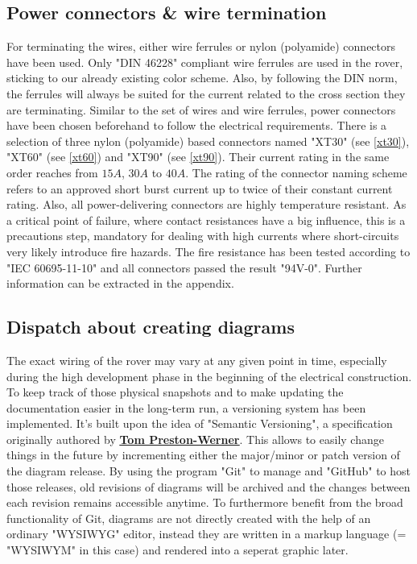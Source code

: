 
    \clearpage %

    \subsection{Power connectors \& wire termination}

    
    For terminating the wires, either wire ferrules or nylon (polyamide) connectors have been used. Only "DIN 46228" compliant wire ferrules are used in the rover, sticking to our already existing color scheme. Also, by following the DIN norm, the ferrules will always be suited for the current related to the cross section they are terminating. Similar to the set of wires and wire ferrules, power connectors have been chosen beforehand to follow the electrical requirements. There is a selection of three nylon (polyamide) based connectors named "XT30" (see \ref{xt30}), "XT60" (see \ref{xt60}) and "XT90" (see \ref{xt90}). Their current rating in the same order reaches from $15A$, $30A$ to $40A$. The rating of the connector naming scheme refers to an approved short burst current up to twice of their constant current rating. Also, all power-delivering connectors are highly temperature resistant. As a critical point of failure, where contact resistances have a big influence, this is a precautions step, mandatory for dealing with high currents where short-circuits very likely introduce fire hazards. The fire resistance has been tested according to "IEC 60695-11-10" and all connectors passed the result "94V-0". Further information can be extracted in the appendix.

    \subsection{Dispatch about creating diagrams}

    The exact wiring of the rover may vary at any given point in time, especially during the high development phase in the beginning of the electrical construction. To keep track of those physical snapshots and to make updating the documentation easier in the long-term run, a versioning system has been implemented. It's built upon the idea of "Semantic Versioning", a specification originally authored by \href{https://tom.preston-werner.com/}{\textbf{\underline{Tom Preston-Werner}}}. This allows to easily change things in the future by incrementing either the major/minor or patch version of the diagram release. By using the program "Git" to manage and "GitHub" to host those releases, old revisions of diagrams will be archived and the changes between each revision remains accessible anytime. To furthermore benefit from the broad functionality of Git, diagrams are not directly created with the help of an ordinary "WYSIWYG" editor, instead they are written in a markup language (= "WYSIWYM" in this case) and rendered into a seperat graphic later. 


